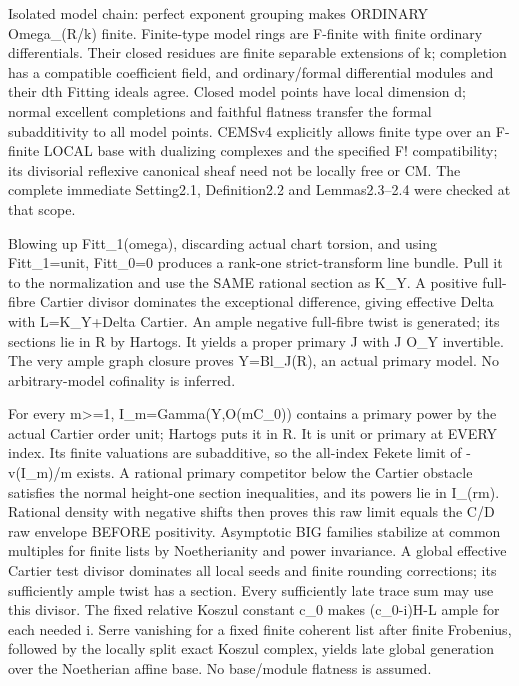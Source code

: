 \documentclass[11pt]{article}
\begin{document}
Isolated model chain: perfect exponent grouping makes ORDINARY Omega\_(R/k) finite. Finite-type model rings are F-finite with finite ordinary differentials. Their closed residues are finite separable extensions of k; completion has a compatible coefficient field, and ordinary/formal differential modules and their dth Fitting ideals agree. Closed model points have local dimension d; normal excellent completions and faithful flatness transfer the formal subadditivity to all model points. CEMSv4 explicitly allows finite type over an F-finite LOCAL base with dualizing complexes and the specified F! compatibility; its divisorial reflexive canonical sheaf need not be locally free or CM. The complete immediate Setting2.1, Definition2.2 and Lemmas2.3--2.4 were checked at that scope.

Blowing up Fitt\_1(omega), discarding actual chart torsion, and using Fitt\_1=unit, Fitt\_0=0 produces a rank-one strict-transform line bundle. Pull it to the normalization and use the SAME rational section as K\_Y. A positive full-fibre Cartier divisor dominates the exceptional difference, giving effective Delta with L=K\_Y+Delta Cartier. An ample negative full-fibre twist is generated; its sections lie in R by Hartogs. It yields a proper primary J with J O\_Y invertible. The very ample graph closure proves Y=Bl\_J(R), an actual primary model. No arbitrary-model cofinality is inferred.

For every m>=1, I\_m=Gamma(Y,O(mC\_0)) contains a primary power by the actual Cartier order unit; Hartogs puts it in R. It is unit or primary at EVERY index. Its finite valuations are subadditive, so the all-index Fekete limit of -v(I\_m)/m exists. A rational primary competitor below the Cartier obstacle satisfies the normal height-one section inequalities, and its powers lie in I\_(rm). Rational density with negative shifts then proves this raw limit equals the C/D raw envelope BEFORE positivity. Asymptotic BIG families stabilize at common multiples for finite lists by Noetherianity and power invariance. A global effective Cartier test divisor dominates all local seeds and finite rounding corrections; its sufficiently ample twist has a section. Every sufficiently late trace sum may use this divisor. The fixed relative Koszul constant c\_0 makes (c\_0-i)H-L ample for each needed i. Serre vanishing for a fixed finite coherent list after finite Frobenius, followed by the locally split exact Koszul complex, yields late global generation over the Noetherian affine base. No base/module flatness is assumed.
\end{document}
